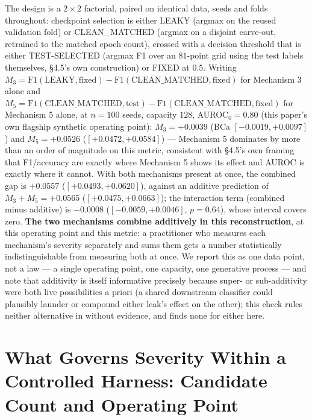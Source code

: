 \documentclass[10pt]{article} %
\begin{document}
The design is a $2\times2$ factorial, paired on identical data, seeds and
folds throughout: checkpoint selection is either LEAKY (argmax on the reused
validation fold) or CLEAN\_MATCHED (argmax on a disjoint carve-out, retrained
to the matched epoch count), crossed with a decision threshold that is either
TEST-SELECTED (argmax F1 over an $81$-point grid using the test labels
themselves, \S4.5's own construction) or FIXED at $0.5$. Writing
$M_3=\text{F1}(\text{LEAKY},\text{fixed})-\text{F1}(\text{CLEAN\_MATCHED},\text{fixed})$
for Mechanism 3 alone and
$M_5=\text{F1}(\text{CLEAN\_MATCHED},\text{test})-\text{F1}(\text{CLEAN\_MATCHED},\text{fixed})$
for Mechanism 5 alone, at $n{=}100$ seeds, capacity $128$, AUROC$_0=0.80$ (this
paper's own flagship synthetic operating point): $M_3=+0.0039$ (BCa
$[-0.0019,+0.0097]$) and $M_5=+0.0526$ ($[+0.0472,+0.0584]$) --- Mechanism 5
dominates by more than an order of magnitude on this metric, consistent with
\S4.5's own framing that F1/accuracy are exactly where Mechanism 5 shows its
effect and AUROC is exactly where it cannot. With both mechanisms present at
once, the combined gap is $+0.0557$ ($[+0.0493,+0.0620]$), against an additive
prediction of $M_3+M_5=+0.0565$ ($[+0.0475,+0.0663]$); the interaction term
(combined minus additive) is $-0.0008$ ($[-0.0059,+0.0046]$, $p=0.64$), whose
interval covers zero. \textbf{The two mechanisms combine additively in this
reconstruction}, at this operating point and this metric: a practitioner who
measures each mechanism's severity separately and sums them gets a number
statistically indistinguishable from measuring both at once. We report this
as one data point, not a law --- a single operating point, one capacity, one
generative process --- and note that additivity is itself informative
precisely because super- or sub-additivity were both live possibilities a
priori (a shared downstream classifier could plausibly launder or compound
either leak's effect on the other); this check rules neither alternative in
without evidence, and finds none for either here.

\section{What Governs Severity Within a Controlled Harness: Candidate Count and Operating Point}
\label{sec:governs}
\end{document}
